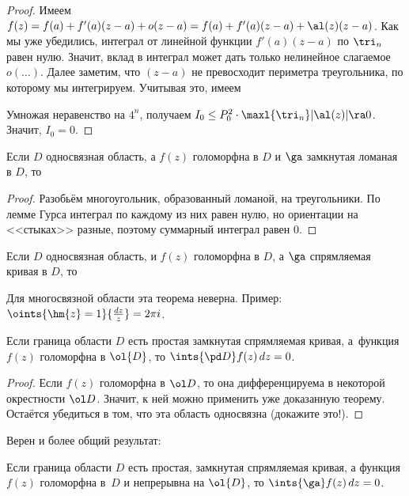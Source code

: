 \documentclass[a4paper]{article}
\begin{document}
\begin{solution}
\begin{proof}
Имеем $f(z)=f(a)+f'(a)(z-a)+o(z-a)  = f(a) + f'(a)(z-a) + \al(z)(z-a)$.
Как мы уже убедились, интеграл от линейной функции $f'(a)(z-a)$ по $\tri_n$ равен нулю. Значит, вклад
в интеграл может дать только нелинейное слагаемое $o(\dots)$. Далее заметим, что $(z-a)$ не превосходит периметра
треугольника, по которому мы интегрируем. Учитывая это, имеем


Умножая неравенство на $4^n$, получаем $I_0 \le P_0^2\cdot\maxl{\tri_n}|\al(z)| \ra 0$. Значит, $I_0 = 0$.
\end{proof}
\begin{imp}
Если $D$ односвязная область, а $f(z)$ голоморфна в $D$ и $\ga$ замкнутая ломаная в $D$, то
\end{imp}
\begin{proof}
Разобьём многоугольник, образованный ломаной, на треугольники. По лемме Гурса интеграл по каждому из них равен нулю,
но ориентации на <<стыках>> разные, поэтому суммарный интеграл равен $0$.
\end{proof}
\begin{imp}
Если $D$ односвязная область, и $f(z)$ голоморфна в $D$, а $\ga$ спрямляемая кривая в $D$, то
\end{imp}

\begin{note}
Для многосвязной области эта теорема неверна. Пример: $\oints{\hm{z} = 1}{\frac{dz}{z}} = 2\pi i$.
\end{note}

\begin{imp}
Если граница области $D$ есть простая замкнутая спрямляемая кривая, а~функция $f(z)$ голоморфна в $\ol{D}$,
то $\ints{\pd D}f(z)\,dz = 0$.
\end{imp}
\begin{proof}
Если $f(z)$ голоморфна в $\ol D$, то она дифференцируема в некоторой окрестности $\ol D$. Значит, к ней
можно применить уже доказанную теорему. Остаётся убедиться в том, что эта область односвязна (докажите это!).
\end{proof}

Верен и более общий результат:
\begin{theorem}
Если граница области $D$ есть простая, замкнутая спрямляемая кривая, а функция $f(z)$ голоморфна в~$D$ и
непрерывна на $\ol{D}$, то $\ints{\ga}f(z)\,dz = 0$.
\end{theorem}


\end{solution}
\end{document}
